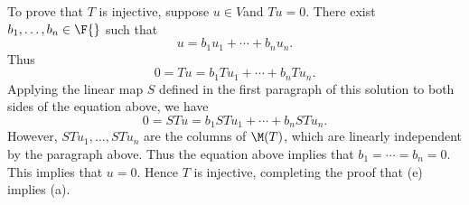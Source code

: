 \begin{Solution}
To prove that $T$ is injective, suppose $u \in V$and $Tu = 0$. There exist $b_1, \ldots, b_n \in \F{}$ such that
\[
u = b_1 u_1 + \cdots + b_n u_n.
\]
Thus
\[
0 = Tu = b_1 Tu_1 + \cdots + b_n Tu_n.
\]
Applying the linear map $S$ defined in the first paragraph of this solution to both sides of the equation above, we have
\[
0 = STu = b_1 STu_1 + \cdots + b_n STu_n.
\]
However, $STu_1, \ldots, STu_n$ are the columns of $\M(T)$, which are linearly independent by the paragraph above. Thus the equation above implies that $b_1 = \cdots = b_n = 0$. This implies that $u = 0$. Hence $T$ is injective, completing the proof that (e) implies (a).
\end{Solution}

